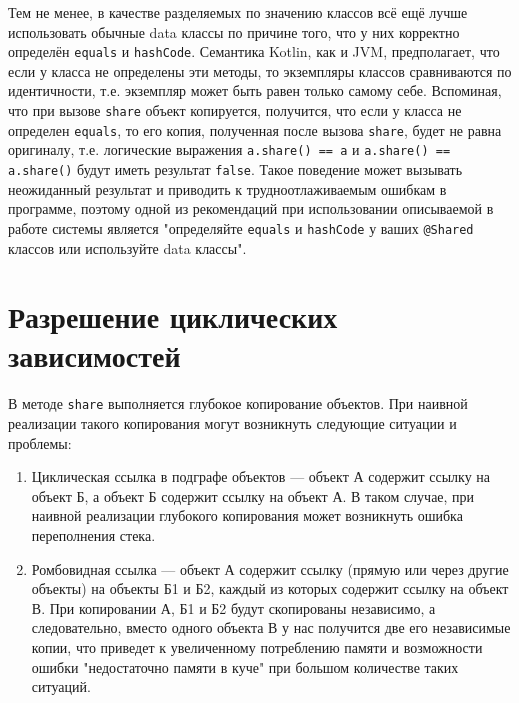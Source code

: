 \documentclass[specification,annotation,times]{itmo-student-thesis}
\begin{document}
Тем не менее, в качестве разделяемых по значению классов всё ещё лучше использовать обычные data классы по причине того, что у них корректно определён \texttt{equals} и \texttt{hashCode}. Семантика Kotlin, как и JVM, предполагает, что если у класса не определены эти методы, то экземпляры классов сравниваются по идентичности, т.е. экземпляр может быть равен только самому себе.
Вспоминая, что при вызове \texttt{share} объект копируется, получится, что если у класса не определен \texttt{equals}, то его копия, полученная после вызова \texttt{share}, будет не равна оригиналу, т.е. логические выражения \texttt{a.share() == a} и \texttt{a.share() == a.share()} будут иметь результат \texttt{false}.
Такое поведение может вызывать неожиданный результат и приводить к трудноотлаживаемым ошибкам в программе, поэтому одной из рекомендаций при использовании описываемой в работе системы является "определяйте \texttt{equals} и \texttt{hashCode} у ваших \texttt{@Shared} классов или используйте data классы".


\section{Разрешение циклических зависимостей}

В методе \texttt{share} выполняется глубокое копирование объектов. При наивной реализации такого копирования могут возникнуть следующие ситуации и проблемы:

\begin{enumerate}
	\item Циклическая ссылка в подграфе объектов --- объект А содержит ссылку на объект Б, а объект Б содержит ссылку на объект А. В таком случае, при наивной реализации глубокого копирования может возникнуть ошибка переполнения стека.
	\item \label{rombic} Ромбовидная ссылка --- объект А содержит ссылку (прямую или через другие объекты) на объекты Б1 и Б2, каждый из которых содержит ссылку на объект В. При копировании А, Б1 и Б2 будут скопированы независимо, а следовательно, вместо одного объекта В у нас получится две его независимые копии, что приведет к увеличенному потреблению памяти и возможности ошибки "недостаточно памяти в куче" при большом количестве таких ситуаций.
\end{enumerate}
\end{document}
